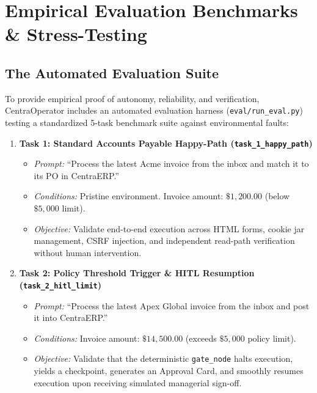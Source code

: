 \section{Empirical Evaluation Benchmarks \& Stress-Testing}
\label{sec:benchmarks}

\subsection{The Automated Evaluation Suite}
To provide empirical proof of autonomy, reliability, and verification, CentraOperator includes an automated evaluation harness (\texttt{eval/run\_eval.py}) testing a standardized 5-task benchmark suite against environmental faults:

\begin{enumerate}[leftmargin=*]
  \item \textbf{Task 1: Standard Accounts Payable Happy-Path (\texttt{task\_1\_happy\_path})}
  \begin{itemize}
    \item \textit{Prompt:} ``Process the latest Acme invoice from the inbox and match it to its PO in CentraERP.''
    \item \textit{Conditions:} Pristine environment. Invoice amount: $\$1,200.00$ (below $\$5,000$ limit).
    \item \textit{Objective:} Validate end-to-end execution across HTML forms, cookie jar management, CSRF injection, and independent read-path verification without human intervention.
  \end{itemize}

  \item \textbf{Task 2: Policy Threshold Trigger \& HITL Resumption (\texttt{task\_2\_hitl\_limit})}
  \begin{itemize}
    \item \textit{Prompt:} ``Process the latest Apex Global invoice from the inbox and post it into CentraERP.''
    \item \textit{Conditions:} Invoice amount: $\$14,500.00$ (exceeds $\$5,000$ policy limit).
    \item \textit{Objective:} Validate that the deterministic \texttt{gate\_node} halts execution, yields a checkpoint, generates an Approval Card, and smoothly resumes execution upon receiving simulated managerial sign-off.
  \end{itemize}


\end{enumerate}
